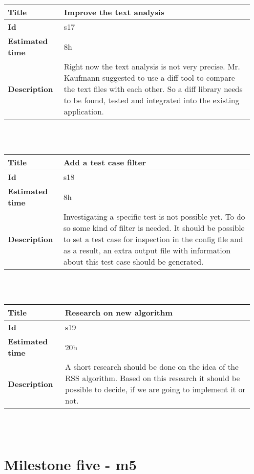         \begin{tabular}{ | p{4cm} | p{10cm} |}
    \hline
    \textbf{Title} & Improve the text analysis\\ \hline
    \textbf{Id} & s17\\ \hline
    \textbf{Estimated time} & 8h \\ \hline
    \textbf{Description} &  Right now the text analysis is not very precise. Mr. Kaufmann suggested to use a diff tool to compare the text files with each other. So a diff library needs to be found, tested and integrated into the existing application.\\ 
    \hline
    \end{tabular} \\\\

        \begin{tabular}{ | p{4cm} | p{10cm} |}
    \hline
    \textbf{Title} & Add a test case filter\\ \hline
    \textbf{Id} & s18\\ \hline
    \textbf{Estimated time} & 8h \\ \hline
    \textbf{Description} &  Investigating a specific test is not possible yet. To do so some kind of filter is needed. It should be possible to set a test case for inspection in the config file and as a result, an extra output file with information about this test case should be generated.\\ 
    \hline
    \end{tabular} \\\\

        \begin{tabular}{ | p{4cm} | p{10cm} |}
    \hline
    \textbf{Title} & Research on new algorithm\\ \hline
    \textbf{Id} & s19\\ \hline
    \textbf{Estimated time} & 20h \\ \hline
    \textbf{Description} &  A short research should be done on the idea of the RSS algorithm. Based on this research it should be possible to decide, if we are going to implement it or not.\\ 
    \hline
    \end{tabular} \\\\


\section{Milestone five - m5}

